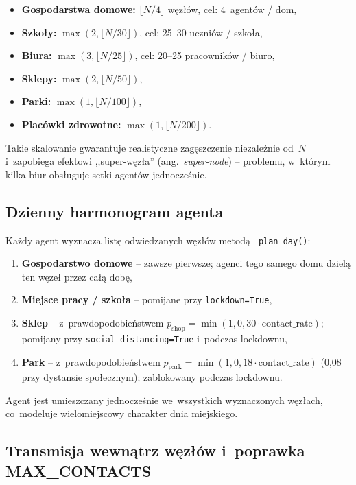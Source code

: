 \documentclass[polish]{projectreport}
\begin{document}
\begin{itemize}
  \item \textbf{Gospodarstwa domowe:} $\lfloor N/4 \rfloor$ węzłów,
        cel: 4~agentów / dom,
  \item \textbf{Szkoły:} $\max(2, \lfloor N/30 \rfloor)$,
        cel: 25--30 uczniów / szkoła,
  \item \textbf{Biura:} $\max(3, \lfloor N/25 \rfloor)$,
        cel: 20--25 pracowników / biuro,
  \item \textbf{Sklepy:} $\max(2, \lfloor N/50 \rfloor)$,
  \item \textbf{Parki:} $\max(1, \lfloor N/100 \rfloor)$,
  \item \textbf{Placówki zdrowotne:} $\max(1, \lfloor N/200 \rfloor)$.
\end{itemize}

Takie skalowanie gwarantuje realistyczne zagęszczenie niezależnie od~$N$
i~zapobiega efektowi ,,super-węzła'' (ang.\ \textit{super-node}) -- problemu,
w~którym kilka biur obsługuje setki agentów jednocześnie.

\subsection{Dzienny harmonogram agenta}
\label{sec:daily-plan}

Każdy agent wyznacza listę odwiedzanych węzłów metodą \texttt{\_plan\_day()}:

\begin{enumerate}
  \item \textbf{Gospodarstwo domowe} -- zawsze pierwsze; agenci tego samego
        domu dzielą ten węzeł przez całą dobę,
  \item \textbf{Miejsce pracy / szkoła} -- pomijane przy \texttt{lockdown=True},
  \item \textbf{Sklep} -- z~prawdopodobieństwem
        $p_{\text{shop}} = \min(1, 0{,}30 \cdot \text{contact\_rate})$;
        pomijany przy \texttt{social\_distancing=True}
        i~podczas lockdownu,
  \item \textbf{Park} -- z~prawdopodobieństwem
        $p_{\text{park}} = \min(1, 0{,}18 \cdot \text{contact\_rate})$
        (0,08 przy dystansie społecznym); zablokowany podczas lockdownu.
\end{enumerate}

Agent jest umieszczany jednocześnie we~wszystkich wyznaczonych węzłach,
co~modeluje wielomiejscowy charakter dnia miejskiego.

\subsection{Transmisja wewnątrz węzłów i~poprawka MAX\_CONTACTS}
\label{sec:transmission-impl}
\end{document}
